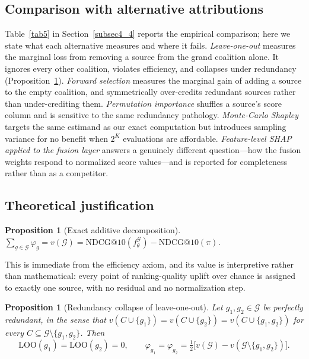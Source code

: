 \documentclass[pdflatex,sn-mathphys-num]{sn-jnl}%
\makeatletter
\theoremstyle{thmstyleone}%
\newtheorem{proposition}[theorem]{Proposition}%
\theoremstyle{thmstyletwo}%
\theoremstyle{thmstylethree}%
\newcommand{\NDCG}{\mathrm{NDCG@10}}
\newcommand{\LOO}{\mathrm{LOO}}
\newcommand{\Gset}{\mathcal{G}}
\makeatother
\begin{document}
\subsection{Comparison with alternative attributions}\label{subsec3_8}

Table~\ref{tab5} in Section~\ref{subsec4_4} reports the empirical comparison; here we state what each alternative measures and where it fails. \emph{Leave-one-out} measures the marginal loss from removing a source from the grand coalition alone. It ignores every other coalition, violates efficiency, and collapses under redundancy (Proposition~\ref{prop2}). \emph{Forward selection} measures the marginal gain of adding a source to the empty coalition, and symmetrically over-credits redundant sources rather than under-crediting them. \emph{Permutation importance} shuffles a source's score column and is sensitive to the same redundancy pathology. \emph{Monte-Carlo Shapley} \cite{castro2009,strumbelj2010} targets the same estimand as our exact computation but introduces sampling variance for no benefit when $2^K$ evaluations are affordable. \emph{Feature-level SHAP applied to the fusion layer} answers a genuinely different question---how the fusion weights respond to normalized score values---and is reported for completeness rather than as a competitor.

\subsection{Theoretical justification}\label{subsec3_9}

\begin{proposition}[Exact additive decomposition]\label{prop1}
$\sum_{g\in\Gset}\varphi_g = v(\Gset) = \NDCG(f^{\Gset}_\theta)-\NDCG(\pi)$.
\end{proposition}

This is immediate from the efficiency axiom, and its value is interpretive rather than mathematical: every point of ranking-quality uplift over chance is assigned to exactly one source, with no residual and no normalization step.

\begin{proposition}[Redundancy collapse of leave-one-out]\label{prop2}
Let $g_1,g_2\in\Gset$ be perfectly redundant, in the sense that
$v(C\cup\{g_1\})=v(C\cup\{g_2\})=v(C\cup\{g_1,g_2\})$
for every $C\subseteq\Gset\setminus\{g_1,g_2\}$. Then
\begin{equation}\label{eq4}
\LOO(g_1)=\LOO(g_2)=0,
\qquad
\varphi_{g_1}=\varphi_{g_2}=\tfrac{1}{2}\bigl[v(\Gset)-v(\Gset\setminus\{g_1,g_2\})\bigr].
\end{equation}
\end{proposition}
\end{document}

